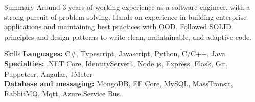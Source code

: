 \documentclass{resume}
\begin{document}

\begin{rSection}{Summary}
Around 3 years of working experience as a software engineer, with a strong pursuit of problem-solving.
Hands-on experience in building enterprise applications and maintaining best practices with OOD.
Followed SOLID principles and design patterns to write clean, maintainable, and adaptive code.
\end{rSection}


\begin{rSection}{Skills}
{\bf Languages:} C\#, Typescript, Javascript, Python, C/C++, Java\\
{\bf Specialties:} .NET Core, IdentityServer4, Node js, Express, Flask, Git, Puppeteer, Angular, JMeter\\
{\bf Database and messaging:} MongoDB, EF Core, MySQL, MassTransit, RabbitMQ, Mqtt, Azure Service Bus.
\end{rSection}

\end{document}

